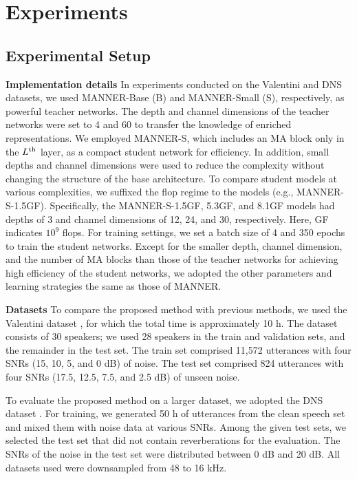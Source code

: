 \documentclass[a4paper]{article}
\begin{document}
\section{Experiments}
\subsection{Experimental Setup}
\textbf{Implementation details} In experiments conducted on the Valentini and DNS datasets, we used MANNER-Base (B) and MANNER-Small (S), respectively, as powerful teacher networks. The depth and channel dimensions of the teacher networks were set to 4 and 60 to transfer the knowledge of enriched representations. We employed MANNER-S, which includes an MA block only in the $L\textsuperscript{th}$ layer, as a compact student network for efficiency. In addition, small depths and channel dimensions were used to reduce the complexity without changing the structure of the base architecture. To compare student models at various complexities, we suffixed the flop regime to the models (e.g., MANNER-S-1.5GF). Specifically, the MANNER-S-1.5GF, 5.3GF, and 8.1GF models had depths of 3 and channel dimensions of 12, 24, and 30, respectively. Here, GF indicates $10^9$ flops. For training settings, we set a batch size of 4 and 350 epochs to train the student networks. Except for the smaller depth, channel dimension, and the number of MA blocks than those of the teacher networks for achieving high efficiency of the student networks, we adopted the other parameters and learning strategies the same as those of MANNER.

\noindent\textbf{Datasets}
To compare the proposed method with previous methods, we used the Valentini dataset \cite{valentini2017noisy}, for which the total time is approximately 10 h. The dataset consists of 30 speakers; we used 28 speakers in the train and validation sets, and the remainder in the test set. The train set comprised 11,572 utterances with four SNRs (15, 10, 5, and 0 dB) of noise. The test set comprised 824 utterances with four SNRs (17.5, 12.5, 7.5, and 2.5 dB) of unseen noise.

To evaluate the proposed method on a larger dataset, we adopted the DNS dataset \cite{reddy2020interspeech}. For training, we generated 50 h of utterances from the clean speech set and mixed them with noise data at various SNRs. Among the given test sets, we selected the test set that did not contain reverberations for the evaluation. The SNRs of the noise in the test set were distributed between 0 dB and 20 dB. All datasets used were downsampled from 48 to 16 kHz.
\end{document}
